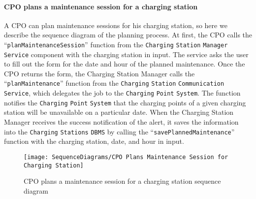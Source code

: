 \paragraph{CPO plans a maintenance session for a charging station}
A CPO can plan maintenance sessions for his charging station, so here we describe the sequence diagram of the planning process.
At first, the CPO calls the ``\verb|planMaintenanceSession|'' function from the \verb|Charging| \verb|Station| \verb|Manager| \verb|Service| component with the charging station in input.
The service asks the user to fill out the form for the date and hour of the planned maintenance.
Once the CPO returns the form, the Charging Station Manager calls the ``\verb|planMaintenance|'' function from the \verb|Charging| \verb|Station| \verb|Communication| \verb|Service|, which delegates the job to the \verb|Charging| \verb|Point| \verb|System|.
The function notifies the \verb|Charging| \verb|Point| \verb|System| that the charging points of a given charging station will be unavailable on a particular date.
When the Charging Station Manager receives the success notification of the alert, it saves the information into the \verb|Charging| \verb|Stations| \verb|DBMS| by calling the ``\verb|savePlannedMaintenance|'' function with the charging station, date, and hour in input.
\begin{figure}[H]
    \begin{center}
        \texttt{[image: SequenceDiagrams/CPO Plans Maintenance Session for Charging Station]}
        \caption{CPO plans a maintenance session for a charging station sequence diagram}
        \label{cpo_plans_maintenance_session_for_charging_station}
    \end{center}
\end{figure}

